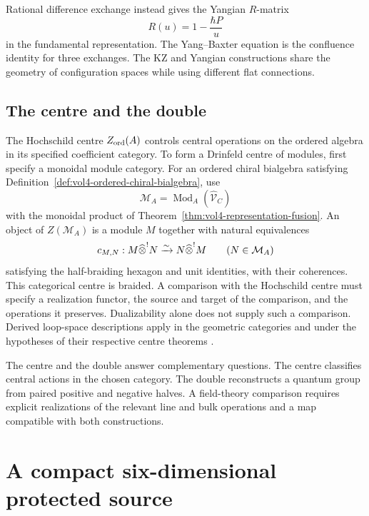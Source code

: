 Rational difference exchange instead gives the Yangian $R$-matrix
\[
 R(u)=1-\frac{\hbar P}{u}
\]
in the fundamental representation. The Yang--Baxter equation is the confluence identity for three exchanges. The KZ and Yangian constructions share the geometry of configuration spaces while using different flat connections.

\chapter{The centre and the double}
The Hochschild centre $Z_{\mathrm{ord}}(A)$ controls central operations on the
ordered algebra in its specified coefficient category.
To form a Drinfeld centre of modules, first specify a monoidal module category.
For an ordered chiral bialgebra satisfying
Definition~\ref{def:vol4-ordered-chiral-bialgebra}, use
\[
 \mathcal M_A=\operatorname{Mod}_A(\widehat{\mathcal V}_C)
\]
with the monoidal product of Theorem~\ref{thm:vol4-representation-fusion}.
An object of $Z(\mathcal M_A)$ is a module $M$ together with natural equivalences
\[
 c_{M,N}:M\widehat{\otimes}^{!}N
 \xrightarrow{\sim}N\widehat{\otimes}^{!}M
 \qquad(N\in\mathcal M_A)
\]
satisfying the half-braiding hexagon and unit identities, with their coherences.
This categorical centre is braided.
A comparison with the Hochschild centre must specify a realization functor,
the source and target of the comparison, and the operations it preserves.
Dualizability alone does not supply such a comparison.
Derived loop-space descriptions apply in the geometric categories and
under the hypotheses of their respective centre theorems
\cite{BenZviFrancisNadler}.

The centre and the double answer complementary questions.
The centre classifies central actions in the chosen category.
The double reconstructs a quantum group from paired positive and negative halves.
A field-theory comparison requires explicit realizations of the relevant
line and bulk operations and a map compatible with both constructions.

\part{A compact six-dimensional protected source}

